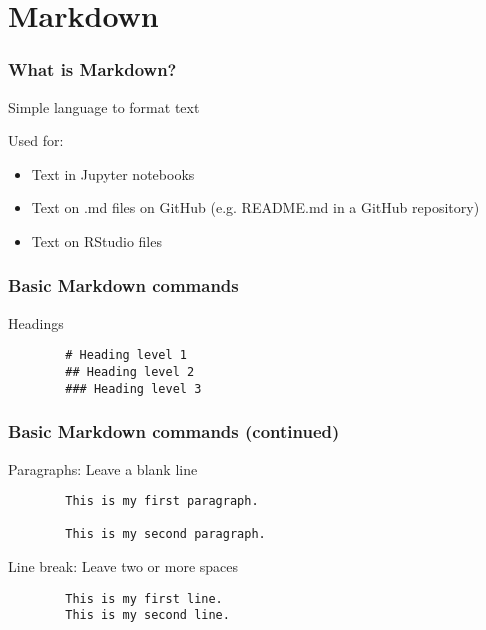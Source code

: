 \documentclass{beamer}
\begin{document}
	\section*{Markdown}

	\begin{frame}
	\frametitle{What is Markdown?}
	Simple language to format text

	Used for:
	\begin{itemize}
		\item Text in Jupyter notebooks
		\item Text on .md files on GitHub (e.g. README.md in a GitHub repository)
		\item Text on RStudio files
	\end{itemize}
	\end{frame}

	\begin{frame}[fragile]
	\frametitle{Basic Markdown commands}
	Headings
	\begin{exampleblock}{}
		\begin{verbatim}
		# Heading level 1
		## Heading level 2
		### Heading level 3
		\end{verbatim}
	\end{exampleblock}
	\end{frame}

	\begin{frame}[fragile]
	\frametitle{Basic Markdown commands (continued)}
	Paragraphs: Leave a blank line
	\begin{exampleblock}{}
		\begin{verbatim}
		This is my first paragraph.

		This is my second paragraph.
		\end{verbatim}
	\end{exampleblock}

	\vspace{0.5cm}

	Line break: Leave two or more spaces
	\begin{exampleblock}{}
		\begin{verbatim}
		This is my first line.   
		This is my second line.
		\end{verbatim}
	\end{exampleblock}
	\end{frame}
\end{document}
